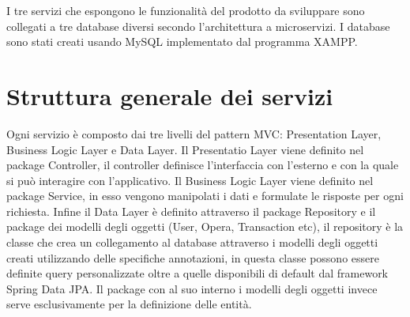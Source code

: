 I tre servizi che espongono le funzionalità del prodotto da sviluppare sono collegati a tre database diversi secondo l'architettura a microservizi. I database sono stati creati usando MySQL implementato dal programma XAMPP. 
\section{Struttura generale dei servizi}
Ogni servizio è composto dai tre livelli del pattern MVC: Presentation Layer, Business Logic Layer e Data Layer. Il Presentatio Layer viene definito nel package Controller, il controller definisce l'interfaccia con l'esterno e con la quale si può interagire con l'applicativo. Il Business Logic Layer viene definito nel package Service, in esso vengono manipolati i dati e formulate le risposte per ogni richiesta. Infine il Data Layer è definito attraverso il package Repository e il package dei modelli degli oggetti (User, Opera, Transaction etc), il repository è la classe che crea un collegamento al database attraverso i modelli degli oggetti creati utilizzando delle specifiche annotazioni, in questa classe possono essere definite query personalizzate oltre a quelle disponibili di default dal framework Spring Data JPA. Il package con al suo interno i modelli degli oggetti invece serve esclusivamente per la definizione delle entità.
